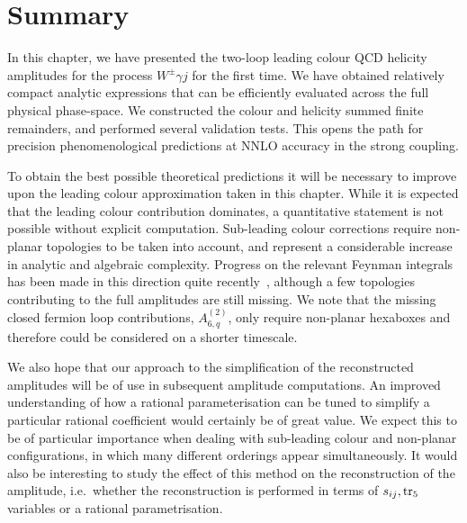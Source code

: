 \documentclass[main.tex]{subfiles}
\begin{document}
\section{Summary}
\label{wyjsec:conclusions}
In this chapter, we have presented the two-loop leading colour QCD helicity amplitudes for the
process $W^{\pm}\gamma j$ for the first time. We have obtained relatively compact analytic
expressions that can be efficiently evaluated across the full physical phase-space. We constructed
the colour and helicity summed finite remainders, and performed several validation tests. This opens
the path for precision phenomenological predictions at NNLO accuracy in the strong coupling.

To obtain the best possible theoretical predictions it will be necessary to improve upon the leading
colour approximation taken in this chapter. While it is expected that the leading colour contribution
dominates, a quantitative statement is not possible without explicit computation. Sub-leading colour
corrections require non-planar topologies to be taken into account, and represent a considerable
increase in analytic and algebraic complexity. Progress on the relevant Feynman integrals has been made in this direction quite
recently~\cite{Abreu:2021smk}, although a few topologies contributing to the full amplitudes are
still missing. We note that the missing closed fermion loop contributions, $A^{(2)}_{6,q}$, only
require non-planar hexaboxes and therefore could be considered on a shorter timescale.

We also hope that our approach to the simplification of the reconstructed amplitudes will be of use in
subsequent amplitude computations. An improved understanding of how a rational parameterisation can
be tuned to simplify a particular rational coefficient would certainly be of great value. We expect
this to be of particular importance when dealing with sub-leading colour and non-planar
configurations, in which many different orderings appear simultaneously. It would also be interesting
to study the effect of this method on the reconstruction of the amplitude, i.e.\ whether the
reconstruction is performed in terms of $s_{ij}, \operatorname{\rm tr}_5$ variables or a rational parametrisation.
\end{document}
